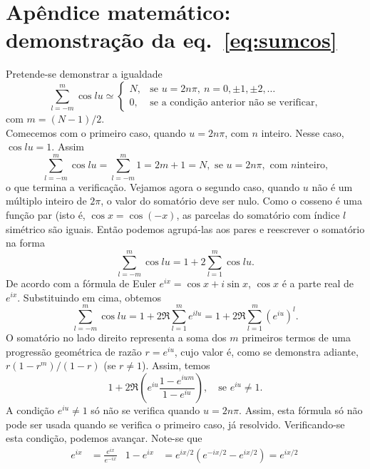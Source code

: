 \section{Apêndice matemático: demonstração da eq.~\protect\eqref{eq:sumcos}}
{\small
Pretende-se demonstrar a igualdade
\begin{equation*}
\sum_{l=-m}^m\cos lu\simeq
\begin{cases}
  N,&\text{se }u=2n\pi,\ n=0,\pm1,\pm2,\ldots\\
  0,&\text{se a condição anterior não se verificar,}
\end{cases}
\end{equation*}
com $m=(N-1)/2$.\\
Comecemos com o primeiro caso, quando $u=2n\pi$, com $n$ inteiro. Nesse caso,
$\cos lu=1$. Assim
\begin{equation*}
\sum_{l=-m}^m\cos lu = \sum_{l=-m}^m 1=2m+1=N,\text{ se }u=2n\pi,\text{ com $n$
inteiro,}
\end{equation*}
o que termina a verificação. Vejamos agora o segundo caso, quando $u$ não é um
múltiplo inteiro de $2\pi$, o valor do somatório deve ser nulo. Como o cosseno é
uma função par (isto é, $\cos x=\cos(-x)$, as parcelas do somatório com índice
$l$ simétrico são iguais. Então podemos agrupá-las aos pares e reescrever o
somatório na forma
\begin{equation*}
\sum_{l=-m}^m\cos lu=1+ 2\sum_{l=1}^m\cos lu.
\end{equation*}
De acordo com a fórmula de Euler $e^{ix}=\cos x+i\sin x$, $\cos x$ é a  parte
real de $e^{ix}$. Substituindo em cima, obtemos
\begin{equation*}
\sum_{l=-m}^m\cos lu=1+ 2\Re\sum_{l=1}^m e^{ilu}
=1+ 2\Re\sum_{l=1}^m \left(e^{iu}\right)^l.
\end{equation*}
O somatório no lado direito representa a soma dos $m$ primeiros termos de uma
progressão geométrica de razão $r=e^{iu}$, cujo valor é, como se demonstra
adiante, $r(1-r^m)/(1-r)$ (se $r\neq 1$). Assim, temos
\begin{equation*}
1+2\Re\left(e^{iu}\frac{1-e^{ium}}{1-e^{iu}}\right),\quad\text{se }e^{iu}\neq1.
\end{equation*}
A condição $e^{iu}\neq1$ só não se verifica quando $u=2n\pi$. Assim, esta
fórmula só não pode ser usada quando se verifica o primeiro caso, já resolvido.
Verificando-se esta condição, podemos avançar. Note-se que
\begin{align*}
e^{ix}&=\frac{e^{ix}}{e^{-ix}}&
1-e^{ix}&=e^{ix/2}\left(e^{-ix/2}-e^{ix/2}\right)=e^{ix/2}\,

\end{align*}}
